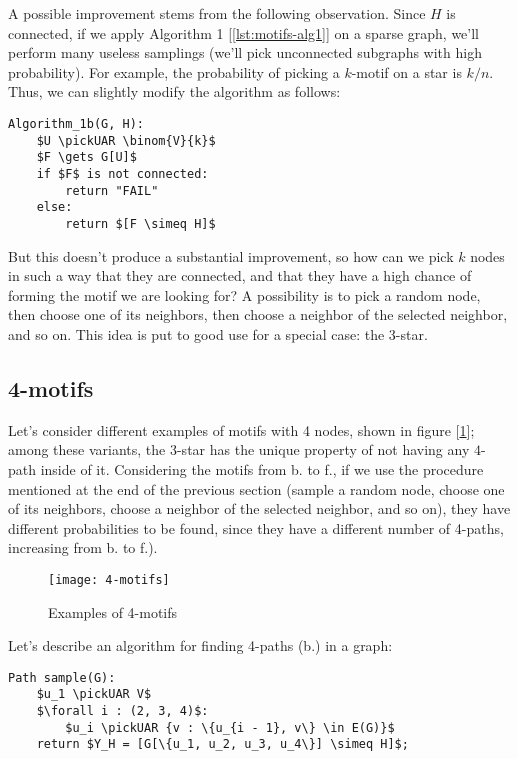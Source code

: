 A possible improvement stems from the following observation. Since $H$ is connected, if we apply Algorithm 1 [\ref{lst:motifs-alg1}] on a sparse graph, we'll perform many useless samplings (we'll pick unconnected subgraphs with high probability). For example, the probability of picking a $k$-motif on a star is $k/n$. Thus, we can slightly modify the algorithm as follows:
\begin{lstlisting}[caption={Algorithm 1b}, label={lst:motifs-alg1b}]
Algorithm_1b(G, H):
    $U \pickUAR \binom{V}{k}$
    $F \gets G[U]$
    if $F$ is not connected:
        return "FAIL"
    else:
        return $[F \simeq H]$
\end{lstlisting}
But this doesn't produce a substantial improvement, so how can we pick $k$ nodes in such a way that they are connected, and that they have a high chance of forming the motif we are looking for? A possibility is to pick a random node, then choose one of its neighbors, then choose a neighbor of the selected neighbor, and so on. This idea is put to good use for a special case: the 3-star.


\subsection{4-motifs}

Let's consider different examples of motifs with 4 nodes, shown in figure [\ref{fig:4-motifs}]; among these variants, the 3-star has the unique property of not having any $4$-path inside of it. Considering the motifs from b. to f., if we use the procedure mentioned at the end of the previous section (sample a random node, choose one of its neighbors, choose a neighbor of the selected neighbor, and so on), they have different probabilities to be found, since they have a different number of 4-paths, increasing from b. to f.).

\begin{figure}
    \centering
    \texttt{[image: 4-motifs]}
    \caption{Examples of 4-motifs}
    \label{fig:4-motifs}
\end{figure}

Let's describe an algorithm for finding 4-paths (b.) in a graph:
\begin{lstlisting}[caption={Algorithm 2 (Path sample)}, label={lst:motifs-alg2}]
Path sample(G):
    $u_1 \pickUAR V$
    $\forall i : (2, 3, 4)$:
        $u_i \pickUAR {v : \{u_{i - 1}, v\} \in E(G)}$
    return $Y_H = [G[\{u_1, u_2, u_3, u_4\}] \simeq H]$;
\end{lstlisting}

